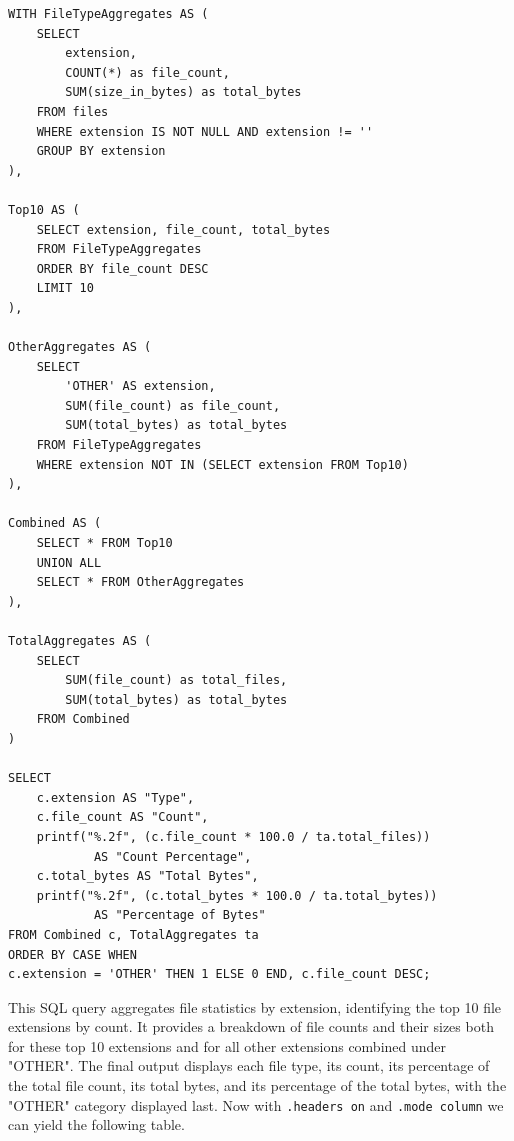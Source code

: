 \documentclass{article}
\begin{document}
\begin{small}
\begin{verbatim}
WITH FileTypeAggregates AS (
    SELECT 
        extension,
        COUNT(*) as file_count,
        SUM(size_in_bytes) as total_bytes
    FROM files
    WHERE extension IS NOT NULL AND extension != ''
    GROUP BY extension
),

Top10 AS (
    SELECT extension, file_count, total_bytes
    FROM FileTypeAggregates
    ORDER BY file_count DESC
    LIMIT 10
),

OtherAggregates AS (
    SELECT 
        'OTHER' AS extension,
        SUM(file_count) as file_count,
        SUM(total_bytes) as total_bytes
    FROM FileTypeAggregates
    WHERE extension NOT IN (SELECT extension FROM Top10)
),

Combined AS (
    SELECT * FROM Top10
    UNION ALL
    SELECT * FROM OtherAggregates
),

TotalAggregates AS (
    SELECT 
        SUM(file_count) as total_files,
        SUM(total_bytes) as total_bytes
    FROM Combined
)

SELECT 
    c.extension AS "Type",
    c.file_count AS "Count",
    printf("%.2f", (c.file_count * 100.0 / ta.total_files))
	        AS "Count Percentage",
    c.total_bytes AS "Total Bytes",
    printf("%.2f", (c.total_bytes * 100.0 / ta.total_bytes))
	        AS "Percentage of Bytes"
FROM Combined c, TotalAggregates ta
ORDER BY CASE WHEN
c.extension = 'OTHER' THEN 1 ELSE 0 END, c.file_count DESC;
\end{verbatim}
\end{small}


This SQL query aggregates file statistics by extension, identifying the top 10 file extensions by count. It provides a breakdown of file counts and their sizes both for these top 10 extensions and for all other extensions combined under "OTHER". The final output displays each file type, its count, its percentage of the total file count, its total bytes, and its percentage of the total bytes, with the "OTHER" category displayed last. Now with \texttt{.headers on} and \texttt{.mode column} we can yield the following table.
\end{document}
